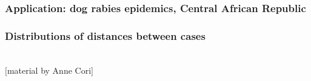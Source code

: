 \documentclass[Xcolor=svgnames,mathserif]{beamer}
\begin{document}
\begin{frame}[fragile]
\frametitle{Application: dog rabies epidemics, Central African Republic}

  
  \begin{center}
  \end{center}


\end{frame}






\begin{frame}[fragile]
  \frametitle{Distributions of distances between cases}

  
  \begin{center}
    ~\\
              {\footnotesize $[$material by Anne Cori$]$}
  \end{center}


\end{frame}
\end{document}
